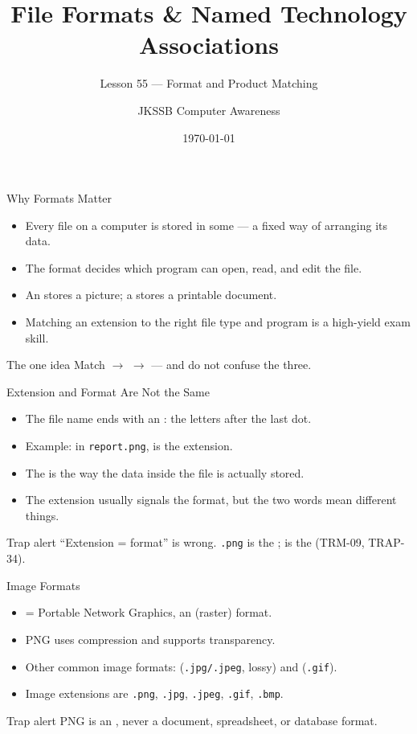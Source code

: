 \documentclass[aspectratio=169]{beamer}
\title{File Formats \& Named Technology Associations}
\subtitle{Lesson 55 --- Format and Product Matching}
\author{JKSSB Computer Awareness}
\date{\today}
\begin{document}
\frame{\titlepage}

\begin{frame}{Why Formats Matter}
  \begin{itemize}
    \item Every file on a computer is stored in some  --- a fixed
      way of arranging its data.
    \item The format decides which program can open, read, and edit the file.
    \item An  stores a picture; a 
      stores a printable document.
    \item Matching an extension to the right file type and program is a
      high-yield exam skill.
  \end{itemize}
  \begin{block}{The one idea}
    Match  $\rightarrow$  $\rightarrow$
     --- and do not confuse the three.
  \end{block}
\end{frame}

\begin{frame}{Extension and Format Are Not the Same}
  \begin{itemize}
    \item The file name ends with an : the letters after the
      last dot.
    \item Example: in \texttt{report.png},  is the extension.
    \item The  is the way the data inside the file is actually
      stored.
    \item The extension usually signals the format, but the two words mean
      different things.
  \end{itemize}
  \begin{alertblock}{Trap alert}
    ``Extension = format'' is wrong. \texttt{.png} is the ;
     is the  (TRM-09, TRAP-34).
  \end{alertblock}
\end{frame}

\begin{frame}{Image Formats}
  \begin{itemize}
    \item {} = Portable Network Graphics, an  (raster)
      format.
    \item PNG uses  compression and supports transparency.
    \item Other common image formats:  (\texttt{.jpg/.jpeg}, lossy)
      and  (\texttt{.gif}).
    \item Image extensions are \texttt{.png}, \texttt{.jpg}, \texttt{.jpeg},
      \texttt{.gif}, \texttt{.bmp}.
  \end{itemize}
  \begin{alertblock}{Trap alert}
    PNG is an , never a document, spreadsheet, or database
    format.
  \end{alertblock}
\end{frame}
\end{document}
